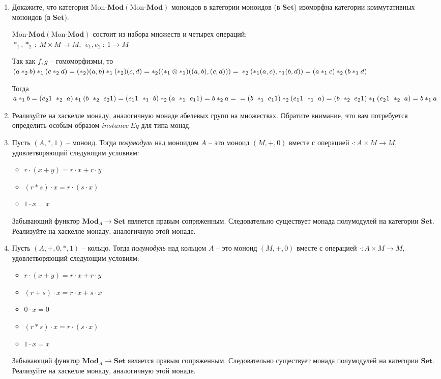 \documentclass[draft]{article}
\newcommand{\cat}[1]{\mathbf{#1}}
\newcommand{\Set}{\cat{Set}}
\newcommand{\fs}[1]{\mathrm{#1}}
\newcommand{\Mod}[1]{#1\text{-}\cat{Mod}}
\begin{document}
\begin{enumerate}
\item Докажите, что категория $\Mod{\fs{Mon}}(\Mod{\fs{Mon}})$ моноидов в категории моноидов (в $\Set$) изоморфна категории коммутативных моноидов (в $\Set$).

$\Mod{\fs{Mon}}(\Mod{\fs{Mon}})$ состоит из набора множеств и четырех операций:\\
 $\ast_1, \ast_2 ~:~ M\times M \to M,~~e_1, e_2 ~:~ 1 \to M $
 
Так как $f, g$ -- гомоморфизмы, то \\
$(a \ast_2 b)\ast_1 (c \ast_2 d) = (\ast_2)(a, b)\ast_1 (\ast_2)(c, d) = \ast_2((\ast_1 \otimes \ast_1)((a, b), (c, d))) = \\
\ast_2(\ast_1(a, c), \ast_1(b, d)) = (a \ast_1 c)\ast_2 (b \ast_1 d)
$

Тогда 
$a \ast_1 b = (e_21 ~\ast_2~ a) \ast_1 (b ~\ast_2~ e_21) = (e_11 ~\ast_1~ b) \ast_2 (a ~\ast_1~ e_11) = b \ast_2 a = \\
=(b ~\ast_1~ e_11) \ast_2 (e_11 ~\ast_1~ a) =  
(b ~\ast_2~ e_21) \ast_1 (e_21 ~\ast_2~ a) = b \ast_1 a
 $

\item Реализуйте на хаскелле монаду, аналогичную монаде абелевых групп на множествах.
Обратите внимание, что вам потребуется определить особым образом $\mathit{instance}\ \mathit{Eq}$ для типа монад.

\item Пусть $(A,*,1)$ -- моноид.
Тогда \emph{полумодуль} над моноидом $A$ -- это моноид $(M,+,0)$ вместе с операцией $\cdot : A \times M \to M$, удовлетворяющий следующим условиям:
\begin{itemize}
\item $r \cdot (x + y) = r \cdot x + r \cdot y$
\item $(r * s) \cdot x = r \cdot (s \cdot x)$
\item $1 \cdot x = x$
\end{itemize}
Забывающий функтор $\cat{Mod}_A \to \Set$ является правым сопряженным.
Следовательно существует монада полумодулей на категории $\Set$.
Реализуйте на хаскелле монаду, аналогичную этой монаде.

\item Пусть $(A,+,0,*,1)$ -- кольцо.
Тогда \emph{полумодуль} над кольцом $A$ -- это моноид $(M,+,0)$ вместе с операцией $\cdot : A \times M \to M$, удовлетворяющий следующим условиям:
\begin{itemize}
\item $r \cdot (x + y) = r \cdot x + r \cdot y$
\item $(r + s) \cdot x = r \cdot x + s \cdot x$
\item $0 \cdot x = 0$
\item $(r * s) \cdot x = r \cdot (s \cdot x)$
\item $1 \cdot x = x$
\end{itemize}
Забывающий функтор $\cat{Mod}_A \to \Set$ является правым сопряженным.
Следовательно существует монада полумодулей на категории $\Set$.
Реализуйте на хаскелле монаду, аналогичную этой монаде.


\end{enumerate}
\end{document}
